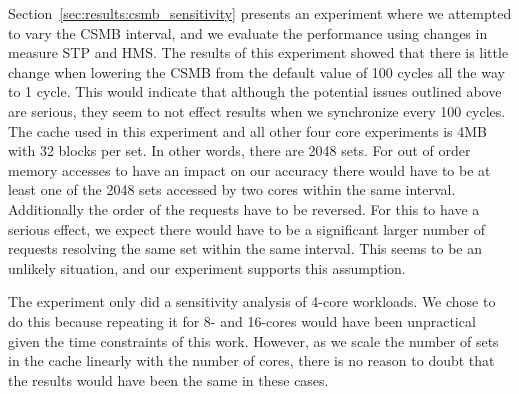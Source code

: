 Section~\ref{sec:results:csmb_sensitivity} presents an experiment where we attempted to vary the CSMB interval, and we evaluate the performance using changes in measure STP and HMS.
The results of this experiment showed that there is little change when lowering the CSMB from the default value of 100 cycles all the way to 1 cycle.
This would indicate that although the potential issues outlined above are serious, they seem to not effect results when we synchronize every 100 cycles.
The cache used in this experiment and all other four core experiments is 4MB with 32 blocks per set.
In other words, there are 2048 sets.
For out of order memory accesses to have an impact on our accuracy there would have to be at least one of the 2048 sets accessed by two cores within the same interval.
Additionally the order of the requests have to be reversed.
For this to have a serious effect, we expect there would have to be a significant larger number of requests resolving the same set within the same interval.
This seems to be an unlikely situation, and our experiment supports this assumption.

The experiment only did a sensitivity analysis of 4-core workloads. 
We chose to do this because repeating it for 8- and 16-cores would have been unpractical given the time constraints of this work. 
However, as we scale the number of sets in the cache linearly with the number of cores, there is no reason to doubt that the results would have been the same in these cases.